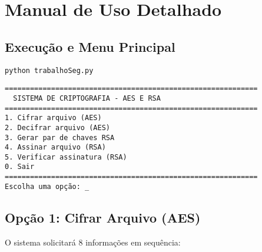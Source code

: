 \documentclass[12pt,a4paper]{article}
\begin{document}
\section{Manual de Uso Detalhado}

\subsection{Execução e Menu Principal}

\begin{lstlisting}[style=bashstyle]
python trabalhoSeg.py
\end{lstlisting}

\begin{tcolorbox}[colback=darkblue!90,coltext=white]
\footnotesize
\begin{verbatim}
============================================================
  SISTEMA DE CRIPTOGRAFIA - AES E RSA
============================================================
1. Cifrar arquivo (AES)
2. Decifrar arquivo (AES)
3. Gerar par de chaves RSA
4. Assinar arquivo (RSA)
5. Verificar assinatura (RSA)
0. Sair
============================================================
Escolha uma opção: _
\end{verbatim}
\end{tcolorbox}

\subsection{Opção 1: Cifrar Arquivo (AES)}

O sistema solicitará 8 informações em sequência:
\end{document}
